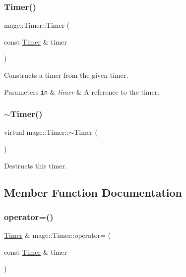 \subsubsection{\texorpdfstring{Timer()}{Timer()}\hspace{0.1cm}{\footnotesize\ttfamily [2/2]}}
{\footnotesize\ttfamily mage\+::\+Timer\+::\+Timer (\begin{DoxyParamCaption}\item[{const \hyperlink{classmage_1_1_timer}{Timer} \&}]{timer }\end{DoxyParamCaption})}

Constructs a timer from the given timer.


\begin{DoxyParams}[1]{Parameters}
\mbox{\tt in}  & {\em timer} & A reference to the timer. \\
\hline
\end{DoxyParams}
\hypertarget{classmage_1_1_timer_aa91cebe8c59c189fde93932fde10265c}{}\label{classmage_1_1_timer_aa91cebe8c59c189fde93932fde10265c} 
\subsubsection{\texorpdfstring{$\sim$\+Timer()}{~Timer()}}
{\footnotesize\ttfamily virtual mage\+::\+Timer\+::$\sim$\+Timer (\begin{DoxyParamCaption}{ }\end{DoxyParamCaption})\hspace{0.3cm}{\ttfamily [virtual]}}

Destructs this timer. 

\subsection{Member Function Documentation}
\hypertarget{classmage_1_1_timer_aaeff75810b47c1d9a01d3821e656eac9}{}\label{classmage_1_1_timer_aaeff75810b47c1d9a01d3821e656eac9} 
\subsubsection{\texorpdfstring{operator=()}{operator=()}}
{\footnotesize\ttfamily \hyperlink{classmage_1_1_timer}{Timer} \& mage\+::\+Timer\+::operator= (\begin{DoxyParamCaption}\item[{const \hyperlink{classmage_1_1_timer}{Timer} \&}]{timer }\end{DoxyParamCaption})}

